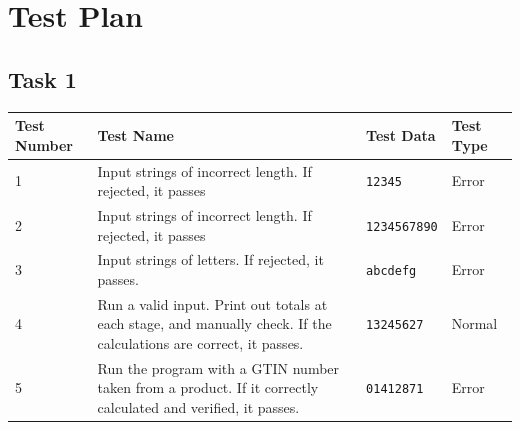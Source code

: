 \documentclass[a4paper]{article}
\begin{document}
\pagebreak

\section{Test Plan}

\subsection{Task 1}
\begin{center}
\begin{tabular}{ | m{4em} | m{19em} | m{7em} | m{10em} | }
  \hline
  Test Number & Test Name & Test Data & Test Type	\\ [0.5ex] 
  \hline\hline
  1 & Input strings of incorrect length. If rejected, it passes & \verb|12345| & Error \\
  \hline 
  2 & Input strings of incorrect length. If rejected, it passes & \verb|1234567890| & Error \\
  \hline 
  3 & Input strings of letters. If rejected, it passes. & \verb|abcdefg| & Error \\
  \hline 
  4 & Run a valid input. Print out totals at each stage, and manually check. If the calculations are correct, it passes. & \verb|13245627| & Normal \\
  \hline 
  5 & Run the program with a GTIN number taken from a product. If it correctly calculated and verified, it passes.
 & \verb|01412871| & Error \\
  \hline
\end{tabular}
\end{center}
\end{document}
